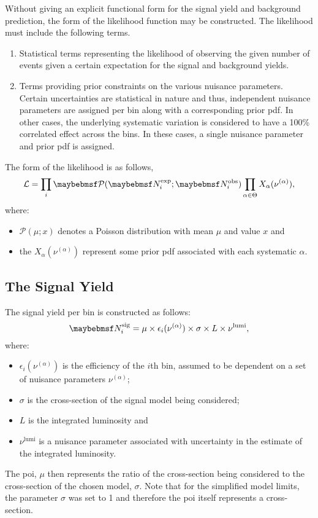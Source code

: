 Without giving an explicit functional form for the signal yield and background
prediction, the form of the likelihood function may be constructed. The
likelihood must include the following terms.
\begin{enumerate}
\item Statistical terms representing the likelihood of observing the given
  number of events given a certain expectation for the signal and background
  yields.
\item Terms providing prior constraints on the various nuisance
  parameters. Certain uncertainties are statistical in nature and thus,
  independent nuisance parameters are assigned per bin along with a
  corresponding prior \ac{pdf}. In other cases,
  the underlying systematic variation is considered to have a 100\% correlated
  effect across the bins. In these cases, a single nuisance parameter and prior
  \ac{pdf} is assigned.
\end{enumerate}

The form of the likelihood is as follows,
\begin{equation*}
\mathcal{L} = \prod_i \Poisson(\NExpi ; \NObsi)
\prod_{\alpha \in \Theta}  X_\alpha(\nu^{(\alpha)}),
\end{equation*}
where:
\begin{itemize}
\item $\mathcal{P}(\mu;x)$ denotes a Poisson distribution with mean $\mu$ and value
$x$ and
\item the $X_\alpha(\nu^{(\alpha)})$ represent some prior \ac{pdf} associated with
  each systematic $\alpha$.
\end{itemize}

\subsection{The Signal Yield}
The signal yield per bin is constructed as follows:
\begin{equation*}
\NSigi = \mu \times \epsilon_i(\nu^{(\alpha)}) \times \sigma \times L \times \nu^{\textrm{lumi}},
\end{equation*}
where:
\begin{itemize}
\item $\epsilon_i(\nu^{(\alpha)})$ is the efficiency of the $i$th bin, assumed to be
  dependent on a set of nuisance parameters $\nu^{(\alpha)}$;
\item $\sigma$ is the cross-section of the signal model being considered;
\item $L$ is the integrated luminosity and
\item $\nu^{\textrm{lumi}}$ is a nuisance parameter associated with uncertainty
  in the estimate of the integrated luminosity.
\end{itemize}
The \ac{poi}, $\mu$ then represents the ratio of the cross-section being
considered to the cross-section of the chosen model, $\sigma$. Note that for the
simplified model limits, the parameter $\sigma$ was set to 1 and therefore the
\ac{poi} itself represents a cross-section.

